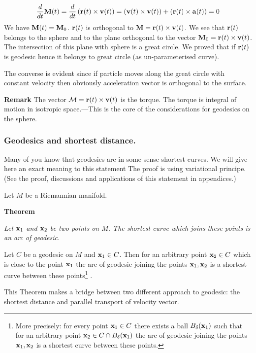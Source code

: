 \documentclass[12pt]{article}
\theoremstyle{theorem}
\numberwithin{equation}{section}
\begin{document}
               \begin{equation}\label{momentofmotion}
{d\over dt}{\bf M}(t)={d\over dt}\left({\bf r}(t)\times {\bf v}(t)\right)=
\left({\bf v}(t)\times {\bf v}(t)\right)+\left({\bf r}(t)\times {\bf a}(t)\right)=0
              \end{equation}
         We have ${\bf M}(t)={\bf M}_0$.  ${\bf r}(t)$ is orthogonal to ${\bf M}={\bf r}(t)\times {\bf v}(t)$.
         We see that ${\bf r}(t)$ belongs to the sphere and to the plane orthogonal to the vector ${\bf M}_0={\bf r}(t)\times {\bf v}(t)$.
         The intersection of this plane with sphere is a great circle.
         We proved that if ${\bf r}(t)$ is geodesic hence it belongs to great circle (as un-parameterised curve).

         The converse is evident since if particle moves along the great circle with constant velocity
         then obviously acceleration vector is orthogonal to the surface.

{\bf Remark} The vector ${\cal M}={\bf r}(t)\times {\bf v}(t)$ is the torque. The torque is integral of motion
 in isotropic space.---This is the core of the 
considerations for geodesics on the sphere.



\subsubsection { Geodesics and shortest distance.}
{\footnotesize
 Many of you know that geodesics are in some sense shortest curves.
 We will give here an  exact meaning to this statement 
The proof is using variational principe.
(See the proof, discussions and applications of this statement
in appendices.)

Let $M$ be a Riemannian manifold.

{\bf Theorem}
{\it Let ${\bf x}_1$ and ${\bf x}_2$ be two points on $M$.
The shortest curve which joins these points is an arc of geodesic.

Let $C$ be a geodesic on $M$ and  ${\bf x}_1\in C$. Then for an arbitrary point  ${\bf x}_2\in C$ which is
close to the point ${\bf x}_1$ the arc of geodesic joining the points ${\bf x}_1,{\bf x}_2$ is a shortest curve between
these points\footnote{More precisely: for every point ${\bf x}_1\in C$ there exists a ball $B_{\delta}({\bf x}_1)$
such that for an arbitrary point ${\bf x}_2\in C\cap B_{\delta}({\bf x}_1)$
the arc of geodesic joining the points ${\bf x}_1,{\bf x}_2$ is a shortest curve between
these points.}
.}

}
\m

  This Theorem makes a bridge between two different 
approach to geodesic: the shortest distance and
  parallel transport of velocity vector.
\end{document}
